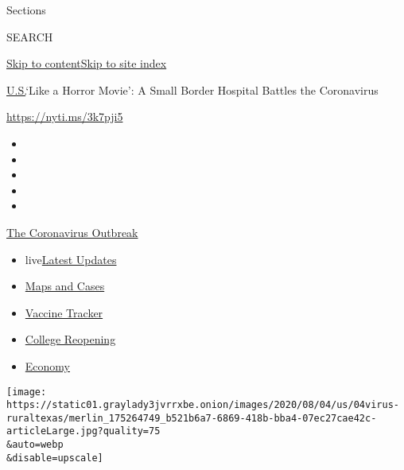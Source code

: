 Sections

SEARCH

\protect\hyperlink{site-content}{Skip to
content}\protect\hyperlink{site-index}{Skip to site index}

\href{/section/us}{U.S.}\textbar{}`Like a Horror Movie': A Small Border
Hospital Battles the Coronavirus

\url{https://nyti.ms/3k7pji5}

\begin{itemize}
\item
\item
\item
\item
\item
\end{itemize}

\href{https://www.nytimes3xbfgragh.onion/news-event/coronavirus?action=click\&pgtype=Article\&state=default\&region=TOP_BANNER\&context=storylines_menu}{The
Coronavirus Outbreak}

\begin{itemize}
\tightlist
\item
  live\href{https://www.nytimes3xbfgragh.onion/2020/08/04/world/coronavirus-cases.html?action=click\&pgtype=Article\&state=default\&region=TOP_BANNER\&context=storylines_menu}{Latest
  Updates}
\item
  \href{https://www.nytimes3xbfgragh.onion/interactive/2020/us/coronavirus-us-cases.html?action=click\&pgtype=Article\&state=default\&region=TOP_BANNER\&context=storylines_menu}{Maps
  and Cases}
\item
  \href{https://www.nytimes3xbfgragh.onion/interactive/2020/science/coronavirus-vaccine-tracker.html?action=click\&pgtype=Article\&state=default\&region=TOP_BANNER\&context=storylines_menu}{Vaccine
  Tracker}
\item
  \href{https://www.nytimes3xbfgragh.onion/2020/08/02/us/covid-college-reopening.html?action=click\&pgtype=Article\&state=default\&region=TOP_BANNER\&context=storylines_menu}{College
  Reopening}
\item
  \href{https://www.nytimes3xbfgragh.onion/live/2020/08/04/business/stock-market-today-coronavirus?action=click\&pgtype=Article\&state=default\&region=TOP_BANNER\&context=storylines_menu}{Economy}
\end{itemize}

\texttt{[image: https://static01.graylady3jvrrxbe.onion/images/2020/08/04/us/04virus-ruraltexas/merlin\_175264749\_b521b6a7-6869-418b-bba4-07ec27cae42c-articleLarge.jpg?quality=75\\\&auto=webp\\\&disable=upscale]}

